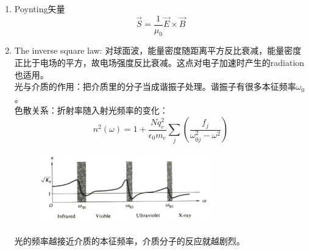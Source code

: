 \documentclass{ctexart}
\begin{document}
\begin{enumerate}
\item Poynting矢量
\begin{equation}
\vec{S}=\frac{1}{\mu_{0}} \vec{E} \times \vec{B}
\end{equation}
\item The inverse square law: 对球面波，能量密度随距离平方反比衰减，能量密度正比于电场的平方，故电场强度反比衰减。这点对电子加速时产生的radiation也适用。\\
光与介质的作用：把介质里的分子当成谐振子处理。谐振子有很多本征频率$\omega_0$。\\
色散关系：折射率随入射光频率的变化：
\begin{equation}
n^{2}(\omega)=1+\frac{N q_{e}^{2}}{\epsilon_{0} m_{e}} \sum_{j}\left(\frac{f_{j}}{\omega_{0 j}^{2}-\omega^{2}}\right)
\end{equation}
\begin{figure}
\center
\includegraphics[width=0.7\textwidth]{色散.png}
\end{figure}
光的频率越接近介质的本征频率，介质分子的反应就越剧烈。
\end{enumerate}
\end{document}
